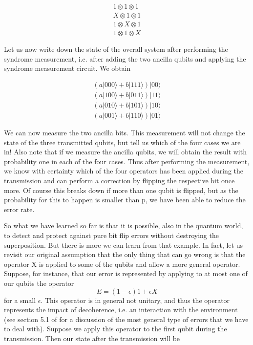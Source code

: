 \documentclass[a4paper, draft]{article}
\theoremstyle{own}
\theoremstyle{remark}
\begin{document}
\begin{align*}
1 \otimes 1 \otimes 1 \\
X \otimes 1 \otimes 1 \\
1 \otimes X \otimes 1 \\
1 \otimes 1 \otimes X
\end{align*}

Let us now write down the state of the overall system after performing the syndrome measurement, i.e. after adding the two ancilla qubits and applying the syndrome measurement circuit. We obtain

\begin{align*}
(a |000\rangle + b |111 \rangle ) |00 \rangle \\
(a |100\rangle + b |011 \rangle ) |11 \rangle \\
(a |010\rangle + b |101 \rangle ) |10 \rangle \\
(a |001\rangle + b |110 \rangle ) |01 \rangle 
\end{align*}

We can now measure the two ancilla bits. This measurement will not change the state of the three transmitted qubits, but tell us which of the four cases we are in! Also note that if we measure the ancilla qubits, we will obtain the result with probability one in each of the four cases. Thus after performing the measurement, we know with certainty which of the four operators has been applied during the transmission and can perform a correction by flipping the respective bit once more. Of course this breaks down if more than one qubit is flipped, but as the probability for this to happen is smaller than p, we have been able to reduce the error rate.

So what we have learned so far is that it is possible, also in the quantum world, to detect and protect against pure bit flip errors without destroying the superposition. But there is more we can learn from that example. In fact, let us revisit our original assumption that the only thing that can go wrong is that the operator X is applied to some of the qubits and allow a more general operator. Suppose, for instance, that our error is represented by applying to at most one of our qubits the operator
$$
E = (1-\epsilon) 1 + \epsilon X
$$
for a small $\epsilon$. This operator is in general not unitary, and thus the operator represents the impact of decoherence, i.e. an interaction with the environment (see section 5.1 of \cite{Steane} for a discussion of the most general type of errors that we have to deal with). Suppose we apply this operator to the first qubit during the transmission. Then our state after the transmission will be
\end{document}
